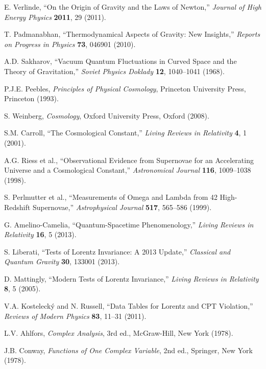 \documentclass[12pt,a4paper]{article}
\begin{document}
\begin{thebibliography}{99}
 E. Verlinde, ``On the Origin of Gravity and the Laws of Newton,'' \emph{Journal of High Energy Physics} \textbf{2011}, 29 (2011).

 T. Padmanabhan, ``Thermodynamical Aspects of Gravity: New Insights,'' \emph{Reports on Progress in Physics} \textbf{73}, 046901 (2010).

 A.D. Sakharov, ``Vacuum Quantum Fluctuations in Curved Space and the Theory of Gravitation,'' \emph{Soviet Physics Doklady} \textbf{12}, 1040--1041 (1968).

 P.J.E. Peebles, \emph{Principles of Physical Cosmology}, Princeton University Press, Princeton (1993).

 S. Weinberg, \emph{Cosmology}, Oxford University Press, Oxford (2008).

 S.M. Carroll, ``The Cosmological Constant,'' \emph{Living Reviews in Relativity} \textbf{4}, 1 (2001).

 A.G. Riess et al., ``Observational Evidence from Supernovae for an Accelerating Universe and a Cosmological Constant,'' \emph{Astronomical Journal} \textbf{116}, 1009--1038 (1998).

 S. Perlmutter et al., ``Measurements of Omega and Lambda from 42 High-Redshift Supernovae,'' \emph{Astrophysical Journal} \textbf{517}, 565--586 (1999).

 G. Amelino-Camelia, ``Quantum-Spacetime Phenomenology,'' \emph{Living Reviews in Relativity} \textbf{16}, 5 (2013).

 S. Liberati, ``Tests of Lorentz Invariance: A 2013 Update,'' \emph{Classical and Quantum Gravity} \textbf{30}, 133001 (2013).

 D. Mattingly, ``Modern Tests of Lorentz Invariance,'' \emph{Living Reviews in Relativity} \textbf{8}, 5 (2005).

 V.A. Kostelecký and N. Russell, ``Data Tables for Lorentz and CPT Violation,'' \emph{Reviews of Modern Physics} \textbf{83}, 11--31 (2011).

 L.V. Ahlfors, \emph{Complex Analysis}, 3rd ed., McGraw-Hill, New York (1978).

 J.B. Conway, \emph{Functions of One Complex Variable}, 2nd ed., Springer, New York (1978).


\end{thebibliography}
\end{document}
